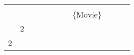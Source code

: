 \begin{table}[]
{\begin{tabular}{lllllllllll}
                          &                           &                   & \cellcolor[HTML]{FC8D59}    &                                                                        &                           &                                                             &                                                                            &                                                                           &                                 &                                                                        \\
                          &                           &                   &                                                                          & \cellcolor[HTML]{FC8D59}    &                           &                                                             &                                                                            &                                                                           &                                 &                                                                        \\
                          &                           &                   &                                                                          &                                                                        &                           &                                                             & \cellcolor[HTML]{FC8D59}$\{\text{Movie}\}$                                 &                                                                           &                                 &                                                                        \\
                          & \cellcolor[HTML]{FC8D59}2 &                   &                                                                          &                                                                        &                           &                                                             &                                                                            &                                                                           &                                 &                                                                        \\
\cellcolor[HTML]{FC8D59}2 &                           &                   &                                                                          &                                                                        &                           &                                                             &                                                                            &                                                                           &                                 &                                                                        \\

\end{tabular}}
\end{table}
